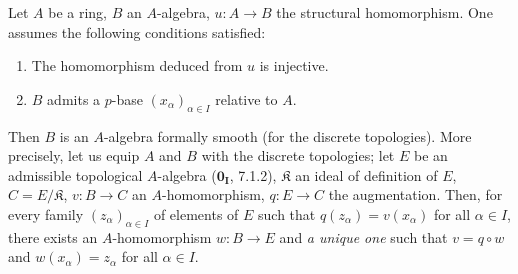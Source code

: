 \begin{theorem}[21.2.7]
\label{0.21.2.7}
Let $A$ be a ring, $B$ an $A$-algebra, $u:A\to B$ the structural homomorphism.
One assumes the following conditions satisfied:
\begin{enumerate}
  \item[\rm(i)] The homomorphism  deduced from $u$ is injective.
  \item[\rm(ii)] $B$ admits a $p$-base $(x_\alpha)_{\alpha\in I}$ relative to $A$.
\end{enumerate}
Then $B$ is an $A$-algebra formally smooth \textup{(}for the discrete topologies\textup{)}.
More precisely, let us equip $A$ and $B$ with the discrete topologies; let $E$ be an admissible topological $A$-algebra \textup{($\mathbf{0_I}$, 7.1.2)}, $\mathfrak K$ an ideal of definition of $E$, $C=E/\mathfrak K$, $v:B\to C$ an $A$-homomorphism, $q:E\to C$ the augmentation.
Then, for every family $(z_\alpha)_{\alpha\in I}$ of elements of $E$ such that $q(z_\alpha)=v(x_\alpha)$ for all $\alpha\in I$, there exists an $A$-homomorphism $w:B\to E$ and \emph{a unique one} such that $v=q\circ w$ and $w(x_\alpha)=z_\alpha$ for all $\alpha\in I$.
\end{theorem}

